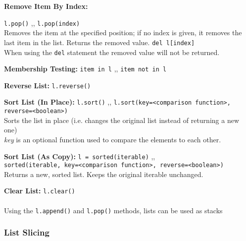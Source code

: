 \begin{indentblock}
        \textbf{Remove Item By Index:}
        \begin{itemize}
             \texttt{l.pop()} \sep{,}
            \texttt{l.pop(index)} \\
            Removes the item at the specified position; if no index is given, it removes the last
            item in the list. Returns the removed value.
             \texttt{del l[index]} \\
            When using the \texttt{del} statement the removed value will not be
            returned.
        \end{itemize}


        \textbf{Membership Testing:} \texttt{item in l} \sep{,}
        \texttt{item not in l}

        \textbf{Reverse List:} \texttt{l.reverse()}

        \textbf{Sort List (In Place):} \texttt{l.sort()} \sep{,}
        \texttt{l.sort(key=<comparison function>, reverse=<boolean>)} \\
        Sorts the list in place (i.e. changes the original list instead of returning a new one)\\
        \textit{key} is an optional function used to compare the elements to each other.

        \textbf{Sort List (As Copy):} \texttt{l = sorted(iterable)} \sep{,} \\
        \texttt{sorted(iterable, key=<comparison function>, reverse=<boolean>)} \\
        Returns a new, sorted list. Keeps the original iterable unchanged.

        \textbf{Clear List:} \texttt{l.clear()}
        \\ \\
        Using the \texttt{l.append()} and \texttt{l.pop()} methods, lists
        can be used as stacks

    \end{indentblock}

    \subsubsection{List Slicing} \label{List Slicing}
